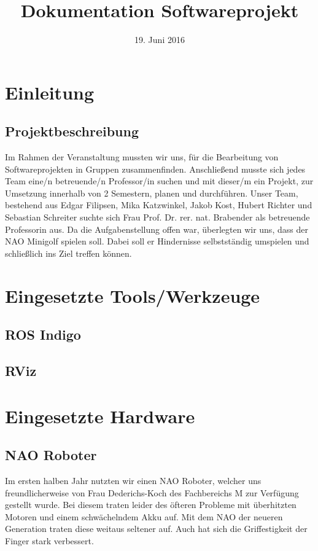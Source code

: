 \documentclass{scrartcl}
\title{Dokumentation Softwareprojekt}
\date{19. Juni 2016}
\begin{document}
\maketitle
\tableofcontents
\newpage

\section{Einleitung}


\subsection{Projektbeschreibung}

Im Rahmen der Veranstaltung mussten wir uns, für die Bearbeitung von Softwareprojekten in Gruppen zusammenfinden. Anschließend musste sich jedes Team eine/n betreuende/n Professor/in suchen und mit dieser/m ein Projekt, zur Umsetzung innerhalb von 2 Semestern, planen und durchführen. Unser Team, bestehend aus Edgar Filipsen, Mika Katzwinkel, Jakob Kost, Hubert Richter und Sebastian Schreiter suchte sich Frau Prof. Dr. rer. nat. Brabender als betreuende Professorin aus.
Da die Aufgabenstellung offen war, überlegten wir uns, dass der NAO Minigolf spielen soll. Dabei soll er Hindernisse selbstständig umspielen und schließlich ins Ziel treffen können.

\section{Eingesetzte Tools/Werkzeuge}

\subsection{ROS Indigo}

\subsection{RViz}

\section{Eingesetzte Hardware}

\subsection{NAO Roboter}
Im ersten halben Jahr nutzten wir einen NAO Roboter, welcher uns freundlicherweise von Frau Dederichs-Koch des Fachbereichs M zur Verfügung gestellt wurde. Bei diesem traten leider des öfteren Probleme mit überhitzten Motoren und einem schwächelndem Akku auf.  
Mit dem NAO der neueren Generation traten diese weitaus seltener auf. Auch hat sich die Griffestigkeit der Finger stark verbessert.
\end{document}
